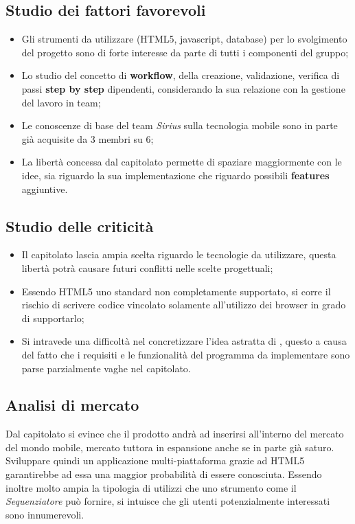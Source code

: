 \subsection{Studio dei fattori favorevoli}
\begin{itemize}
\item Gli strumenti da utilizzare (HTML5, javascript, database) per lo svolgimento del progetto sono di forte interesse da parte di tutti i componenti del gruppo;
\item Lo studio del concetto di \textbf{workflow}, della creazione, validazione, verifica di passi \textbf{step by step} dipendenti, considerando la sua relazione con la gestione del lavoro in team;
\item Le conoscenze di base del team \textit{Sirius} sulla tecnologia mobile sono in parte già acquisite da 3 membri su 6;
\item La libertà concessa dal capitolato permette di spaziare maggiormente con le idee, sia riguardo la sua implementazione che riguardo possibili \textbf{features} aggiuntive.
\end{itemize}
\subsection{Studio delle criticità}
\begin{itemize}
\item Il capitolato lascia ampia scelta riguardo le tecnologie da utilizzare, questa libertà potrà causare futuri conflitti nelle scelte progettuali;
\item Essendo HTML5 uno standard non completamente supportato, si corre il rischio di scrivere codice vincolato solamente all'utilizzo dei browser in grado di supportarlo;
\item Si intravede una difficoltà nel concretizzare l'idea astratta di \progetto , questo a causa del fatto che i requisiti e le funzionalità del programma da implementare sono parse parzialmente vaghe nel capitolato.
\end{itemize}

\subsection{Analisi di mercato}
Dal capitolato si evince che il prodotto andrà ad inserirsi all'interno del mercato del mondo mobile, mercato tuttora in espansione anche se in parte già saturo. Sviluppare quindi un applicazione multi-piattaforma grazie ad HTML5 garantirebbe ad essa una maggior probabilità di essere conosciuta.
Essendo inoltre molto ampia la tipologia di utilizzi che uno strumento come il \textit{Sequenziatore} può fornire, si intuisce che gli utenti potenzialmente interessati sono innumerevoli.

